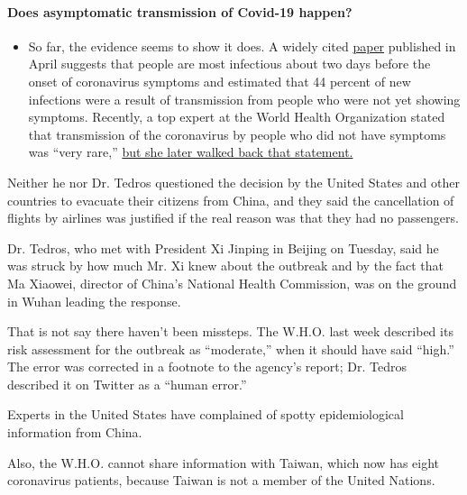 \begin{itemize}
{  \paragraph{Does asymptomatic transmission of Covid-19
  happen?}\label{does-asymptomatic-transmission-of-covid-19-happen}}

  \begin{itemize}
  \tightlist
  \item
    So far, the evidence seems to show it does. A widely cited
    \href{https://www.nature.com/articles/s41591-020-0869-5}{paper}
    published in April suggests that people are most infectious about
    two days before the onset of coronavirus symptoms and estimated that
    44 percent of new infections were a result of transmission from
    people who were not yet showing symptoms. Recently, a top expert at
    the World Health Organization stated that transmission of the
    coronavirus by people who did not have symptoms was ``very rare,''
    \href{https://www.nytimes.com/2020/06/09/world/coronavirus-updates.html?action=click\&pgtype=Article\&state=default\&region=MAIN_CONTENT_3\&context=storylines_faq\#link-1f302e21}{but
    she later walked back that statement.}
  \end{itemize}
\end{itemize}

Neither he nor Dr. Tedros questioned the decision by the United States
and other countries to evacuate their citizens from China, and they said
the cancellation of flights by airlines was justified if the real reason
was that they had no passengers.

Dr. Tedros, who met with President Xi Jinping in Beijing on Tuesday,
said he was struck by how much Mr. Xi knew about the outbreak and by the
fact that Ma Xiaowei, director of China's National Health Commission,
was on the ground in Wuhan leading the response.

That is not say there haven't been missteps. The W.H.O. last week
described its risk assessment for the outbreak as ``moderate,'' when it
should have said ``high.'' The error was corrected in a footnote to the
agency's report; Dr. Tedros described it on Twitter as a ``human
error.''

Experts in the United States have complained of spotty epidemiological
information from China.

Also, the W.H.O. cannot share information with Taiwan, which now has
eight coronavirus patients, because Taiwan is not a member of the United
Nations.

